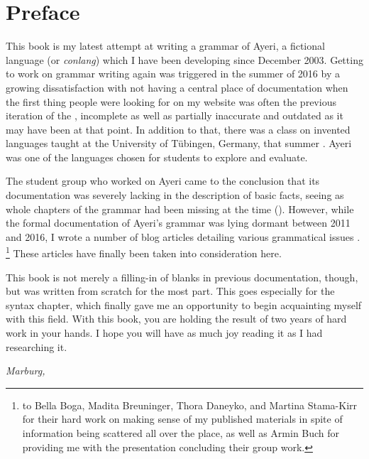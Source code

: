 \chapter{Preface}

This book is my latest attempt at writing a grammar of Ayeri, a fictional
language (or \emph{conlang}) which I have been developing since December
2003. Getting to work on grammar writing again was triggered in the summer of
2016 by a growing dissatisfaction with not having a central place of
documentation when the first thing people were looking for on my website was
often the previous iteration of the , incomplete as well as
partially inaccurate and outdated as it may have been at that point. In
addition to that, there was a class on invented languages taught at the
University of Tübingen, Germany, that summer \autocite{buch2016ss}. Ayeri was
one of the languages chosen for students to explore and evaluate.

The student group who worked on Ayeri came to the conclusion that its
documentation was severely lacking in the description of basic facts, seeing as
whole chapters of the grammar had been missing at the time
(\cite[12]{boga2016}). However, while the formal documentation of Ayeri's
grammar was lying dormant between 2011 and 2016, I wrote a number of blog
articles detailing various grammatical issues \autocite[Blog]{benung}.%
\footnote{ to Bella Boga, Madita
Breuninger, Thora Daneyko, and Martina Stama-Kirr for their hard work on making
sense of my published materials in spite of information being scattered all
over the place, as well as Armin Buch for providing me with the presentation
concluding their group work.} These articles have finally been taken into
consideration here.

This book is not merely a filling-in of blanks in previous documentation,
though, but was written from scratch for the most part. This goes especially
for the syntax chapter, which finally gave me an opportunity to begin
acquainting myself with this field. With this book, you are holding the result
of two years of hard work in your hands. I hope you will have as much joy
reading it as I had researching it.

\begin{flushright}\itshape\footnotesize
{}
Marburg, 
\the\year
\end{flushright}
